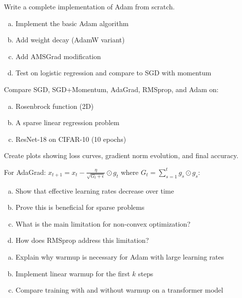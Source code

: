 \documentclass[../main.tex]{subfiles}
\begin{document}
\begin{simpleexercise}
Write a complete implementation of Adam from scratch.
\begin{enumerate}[(a)]
    \item Implement the basic Adam algorithm
    \item Add weight decay (AdamW variant)
    \item Add AMSGrad modification
    \item Test on logistic regression and compare to SGD with momentum
\end{enumerate}
\end{simpleexercise}

\begin{simpleexercise}
Compare SGD, SGD+Momentum, AdaGrad, RMSprop, and Adam on:
\begin{enumerate}[(a)]
    \item Rosenbrock function (2D)
    \item A sparse linear regression problem
    \item ResNet-18 on CIFAR-10 (10 epochs)
\end{enumerate}
Create plots showing loss curves, gradient norm evolution, and final accuracy.
\end{simpleexercise}

\begin{simpleexercise}
For AdaGrad: $x_{t+1} = x_t - \frac{\eta}{\sqrt{G_t + \epsilon}} \odot g_t$ where $G_t = \sum_{s=1}^t g_s \odot g_s$:
\begin{enumerate}[(a)]
    \item Show that effective learning rates decrease over time
    \item Prove this is beneficial for sparse problems
    \item What is the main limitation for non-convex optimization?
    \item How does RMSprop address this limitation?
\end{enumerate}
\end{simpleexercise}

\begin{simpleexercise}
\begin{enumerate}[(a)]
    \item Explain why warmup is necessary for Adam with large learning rates
    \item Implement linear warmup for the first $k$ steps
    \item Compare training with and without warmup on a transformer model
\end{enumerate}
\end{simpleexercise}
\end{document}

